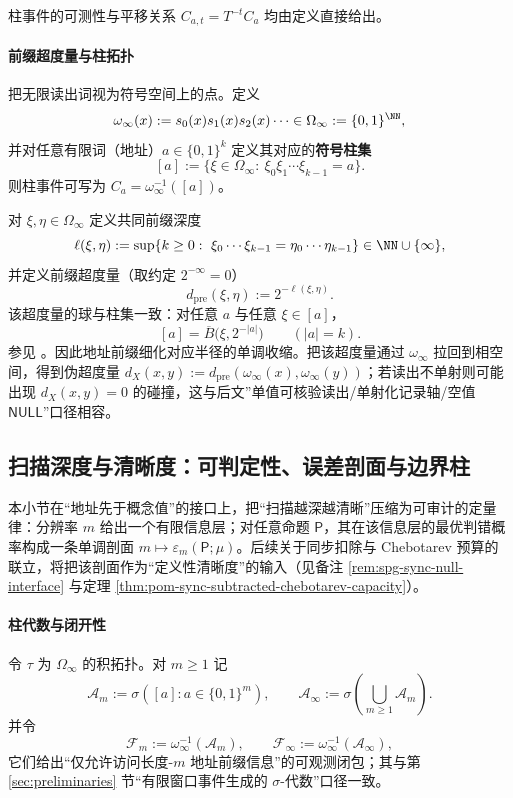 柱事件的可测性与平移关系 $C_{a,t}=T^{-t}C_a$ 均由定义直接给出。



\paragraph{前缀超度量与柱拓扑}\label{par:spg-prefix-ultrametric}
把无限读出词视为符号空间上的点。定义
\[
\omega_\infty(x):=s_0(x)s_1(x)s_2(x)\cdots\in\Omega_\infty:=\{0,1\}^{\NN},
\]
并对任意有限词（地址）$a\in\{0,1\}^k$ 定义其对应的\textbf{符号柱集}
\[
[a]:=\{\xi\in\Omega_\infty:\ \xi_0\xi_1\cdots\xi_{k-1}=a\}.
\]
则柱事件可写为 $C_a=\omega_\infty^{-1}([a])$。
\par
对 $\xi,\eta\in\Omega_\infty$ 定义共同前缀深度
\[
\ell(\xi,\eta):=\sup\{k\ge 0:\ \xi_0\cdots\xi_{k-1}=\eta_0\cdots\eta_{k-1}\}\in\NN\cup\{\infty\},
\]
并定义前缀超度量（取约定 $2^{-\infty}=0$）
\[
d_{\mathrm{pre}}(\xi,\eta):=2^{-\ell(\xi,\eta)}.
\]
该超度量的球与柱集一致：对任意 $a$ 与任意 $\xi\in[a]$，
\[
[a]=\overline{B}\bigl(\xi,2^{-|a|}\bigr)\qquad(|a|=k).
\]
参见 \cite{LindMarcus1995}。因此地址前缀细化对应半径的单调收缩。把该超度量通过 $\omega_\infty$ 拉回到相空间，得到伪超度量 $d_X(x,y):=d_{\mathrm{pre}}(\omega_\infty(x),\omega_\infty(y))$；若读出不单射则可能出现 $d_X(x,y)=0$ 的碰撞，这与后文”单值可核验读出/单射化记录轴/空值 $\mathsf{NULL}$”口径相容。

\subsection{扫描深度与清晰度：可判定性、误差剖面与边界柱}\label{subsec:spg-scan-clarity}
本小节在“地址先于概念值”的接口上，把“扫描越深越清晰”压缩为可审计的定量律：分辨率 $m$ 给出一个有限信息层；对任意命题 $\mathsf P$，其在该信息层的最优判错概率构成一条单调剖面 $m\mapsto \varepsilon_m(\mathsf P;\mu)$。后续关于同步扣除与 Chebotarev 预算的联立，将把该剖面作为“定义性清晰度”的输入（见备注 \ref{rem:spg-sync-null-interface} 与定理 \ref{thm:pom-sync-subtracted-chebotarev-capacity}）。

\paragraph{柱代数与闭开性}
令 $\tau$ 为 $\Omega_\infty$ 的积拓扑。对 $m\ge 1$ 记
\[
\mathcal{A}_m:=\sigma([a]:a\in\{0,1\}^m),
\qquad
\mathcal{A}_\infty:=\sigma\!\left(\bigcup_{m\ge 1}\mathcal{A}_m\right).
\]
并令
\[
\mathcal{F}_m:=\omega_\infty^{-1}(\mathcal{A}_m),
\qquad
\mathcal{F}_\infty:=\omega_\infty^{-1}(\mathcal{A}_\infty),
\]
它们给出“仅允许访问长度-$m$ 地址前缀信息”的可观测闭包；其与第 \ref{sec:preliminaries} 节“有限窗口事件生成的 $\sigma$-代数”口径一致。

